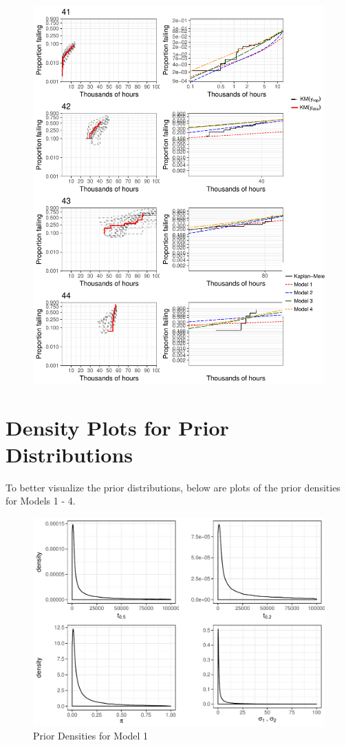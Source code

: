\documentclass[12pt]{article}
\begin{document}
\begin{figure}[H]
\includegraphics[width=\textwidth]{ppcheck-v2-11.pdf}
\end{figure}
\clearpage


\section{Density Plots for Prior Distributions}
To better visualize the prior distributions, below are plots of
the prior densities for Models 1 - 4.
\begin{figure}[H]
\center
\includegraphics[width=\textwidth]{priorsmod1.pdf}
\caption{Prior Densities for Model 1}
\end{figure}
\end{document}
